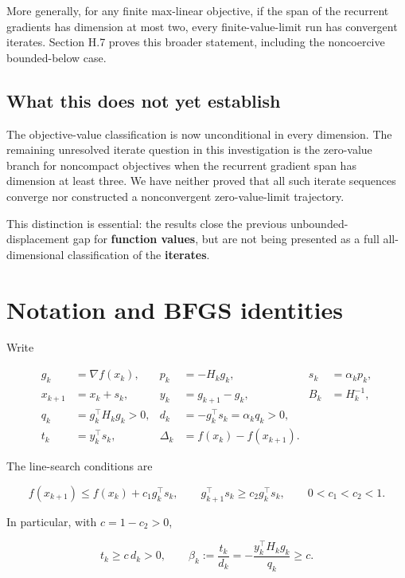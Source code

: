More generally, for any finite max-linear objective, if the span of the
recurrent gradients has dimension at most two, every finite-value-limit
run has convergent iterates. Section H.7 proves this broader statement,
including the noncoercive bounded-below case.

\subsection{What this does not yet
establish}\label{H:what-this-does-not-yet-establish}

The objective-value classification is now unconditional in every
dimension. The remaining unresolved iterate question in this
investigation is the zero-value branch for noncompact objectives when
the recurrent gradient span has dimension at least three. We have
neither proved that all such iterate sequences converge nor constructed
a nonconvergent zero-value-limit trajectory.

This distinction is essential: the results close the previous
unbounded-displacement gap for \textbf{function values}, but are not
being presented as a full all-dimensional classification of the
\textbf{iterates}.


\setcounter{section}{1}
\setcounter{theorem}{0}
\setcounter{lemma}{0}
\setcounter{corollary}{0}
\setcounter{proposition}{0}
\setcounter{remark}{0}
\setcounter{equation}{0}
\section{Notation and BFGS
identities}\label{H:notation-and-bfgs-identities}

Write

\[
\begin{aligned}
g_k&=\nabla f(x_k),&p_k&=-H_kg_k,&s_k&=\alpha_kp_k,\\
x_{k+1}&=x_k+s_k,&y_k&=g_{k+1}-g_k,&B_k&=H_k^{-1},\\
q_k&=g_k^\top H_kg_k>0,&d_k&=-g_k^\top s_k=\alpha_kq_k>0,\\
t_k&=y_k^\top s_k,&\Delta_k&=f(x_k)-f(x_{k+1}).
\end{aligned}
\]

The line-search conditions are

\[
f(x_{k+1})\le f(x_k)+c_1g_k^\top s_k,
\qquad
g_{k+1}^\top s_k\ge c_2g_k^\top s_k,
\qquad0<c_1<c_2<1.
\]

In particular, with \(c=1-c_2>0\),

\[
t_k\ge c\,d_k>0,
\qquad
\beta_k:=\frac{t_k}{d_k}
=-\frac{y_k^\top H_kg_k}{q_k}\ge c.
\]

